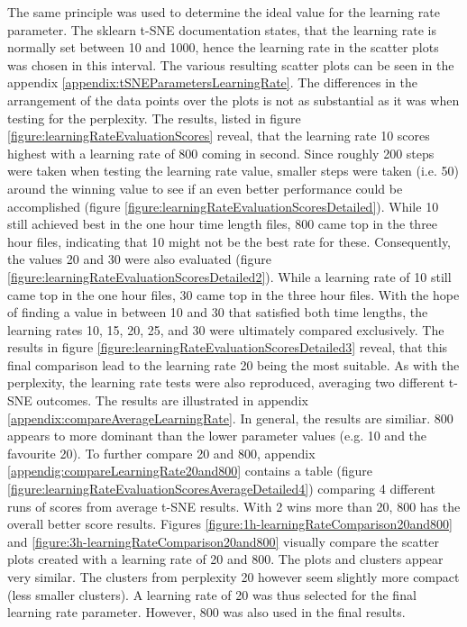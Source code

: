 The same principle was used to determine the ideal value for the learning rate parameter. The sklearn t-SNE documentation states, that the learning rate is normally set between 10 and 1000, hence the learning rate in the scatter plots was chosen in this interval.
The various resulting scatter plots can be seen in the appendix \ref{appendix:tSNEParametersLearningRate}. The differences in the arrangement of the data points over the plots is not as substantial as it was when testing for the perplexity. The results, listed in figure \ref{figure:learningRateEvaluationScores} reveal, that the learning rate 10 scores highest with a learning rate of 800 coming in second. Since roughly 200 steps were taken when testing the learning rate value, smaller steps were taken (i.e. 50) around the winning value to see if an even better performance could be accomplished (figure \ref{figure:learningRateEvaluationScoresDetailed}). While 10 still achieved best in the one hour time length files, 800 came top in the three hour files, indicating that 10 might not be the best rate for these. Consequently, the values 20 and 30 were also evaluated (figure \ref{figure:learningRateEvaluationScoresDetailed2}). While a learning rate of 10 still came top in the one hour files, 30 came top in the three hour files. With the hope of finding a value in between 10 and 30 that satisfied both time lengths, the learning rates 10, 15, 20, 25, and 30 were ultimately compared exclusively. The results in figure \ref{figure:learningRateEvaluationScoresDetailed3} reveal, that this final comparison lead to the learning rate 20 being the most suitable. As with the perplexity, the learning rate tests were also reproduced, averaging two different t-SNE outcomes. The results are illustrated in appendix \ref{appendix:compareAverageLearningRate}. In general, the results are similiar. 800 appears to more dominant than the lower parameter values (e.g. 10 and the favourite 20). To further compare 20 and 800, appendix \ref{appendig:compareLearningRate20and800} contains a table (figure \ref{figure:learningRateEvaluationScoresAverageDetailed4}) comparing 4 different runs of scores from average t-SNE results. With 2 wins more than 20, 800 has the overall better score results. Figures \ref{figure:1h-learningRateComparison20and800} and \ref{figure:3h-learningRateComparison20and800} visually compare the scatter plots created with a learning rate of 20 and 800. The plots and clusters appear very similar. The clusters from perplexity 20 however seem slightly more compact (less smaller clusters). A learning rate of 20 was thus selected for the final learning rate parameter. However, 800 was also used in the final results.

